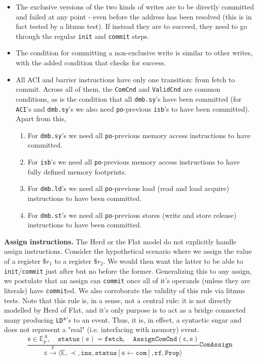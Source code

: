 \documentclass{article}
\newcommand{\var}{\texttt}
\begin{document}
\begin{itemize}
    \item The exclusive versions of the two kinds of writes are to be directly committed and failed at any point - even before the address has been resolved (this is in fact tested by a litmus test). If instead they are to succeed, they need to go through the regular \var{init} and \var{commit} steps.
    \item The condition for committing a non-exclusive write is similar to other writes, with the added condition that checks for success.
    \item All ACI and barrier instructions have only one transition: from fetch to commit. Across all of them, the \texttt{ComCnd} and \texttt{ValidCnd} are common conditions, as is the condition that all \var{dmb.sy}'s have been committed (for \var{ACI}'s and \var{dmb.sy}'s we also need \var{po}-previous \var{isb}'s to have been committed). Apart from this,
    \begin{enumerate}
        \setlength\itemsep{0em}
        \item For \var{dmb.sy}'s we need all \var{po}-previous memory access instructions to have committed.
        \item For \var{isb}'s we need all \var{po}-previous memory access instructions to have fully defined memory footprints.
        \item For \var{dmb.ld}'s we need all \var{po}-previous load (read and load acquire) instructions to have been committed.
        \item For \var{dmb.st}'s we need all \var{po}-previous stores (write and store release) instructions to have been committed.
    \end{enumerate}
\end{itemize}
\textbf{Assign instructions.} The Herd or the Flat model do not explicitly handle assign instructions. Consider the hypothetical scenario where we assign the value of a register $\$r_1$ to a register $\$r_2$. We would then want the latter to be able to \var{init}/\var{commit} just after but no before the former. Generalizing this to any assign, we postulate that an assign can \var{commit} once all of it's operands (unless they are literals) have \var{commit}ed. We also corroborate the validity of this rule via litmus tests. Note that this rule is, in a sense, not a central rule: it is not directly modelled by Herd of Flat, and it's only purpose is to act as a bridge connected many producing \var{LD}*'s to an event. Thus, it is, in effect, a syntactic sugar and does not represent a "real" (i.e. interfacing with memory) event.\\
$$\frac{\mathbb{e} \in \mathbb{E}_p^A, \hspace{1em} \texttt{status}(\mathbb{e}) = \texttt{fetch}, \hspace{1em} \texttt{AssignComCnd}(\mathbb{c},\mathbb{e})}{\mathbb{c} \xrightarrow[]{p} \langle \mathbb{E}, \prec, \texttt{ins}, \texttt{status}[\mathbb{e} \leftarrow \texttt{com}], \texttt{rf}, \texttt{Prop}\rangle} \texttt{ComAssign}$$
\end{document}
